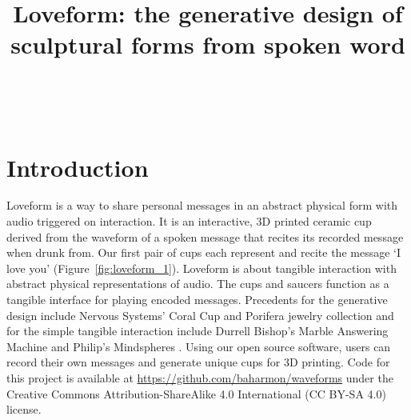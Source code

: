 \documentclass{sigchi}
\def\plaintitle{Loveform: the generative design of sculptural forms from spoken word}
\begin{document}
\title{\plaintitle}

\author{%
  \\
  \\
}

\maketitle

\begin{abstract}
\end{abstract}



\section{Introduction}

Loveform is a way to share personal messages in an abstract physical form with audio triggered on interaction. It is an interactive, 3D printed ceramic cup derived from the waveform of a spoken message that recites its recorded message when drunk from.  Our first pair of cups each represent and recite the message `I love you' (Figure~\ref{fig:loveform_1}). Loveform is about tangible interaction with abstract physical representations of audio. The cups and saucers function as a tangible interface for playing encoded messages. Precedents for the generative design include Nervous Systems’ Coral Cup and Porifera jewelry collection \cite{NervousSystem2018,NervousSystem2018a} and for the simple tangible interaction include Durrell Bishop's Marble Answering Machine \cite{Dragicevic2014} and Philip's Mindspheres \cite{Djajadiningrat2008}. Using our open source software, users can record their own messages and generate unique cups for 3D printing. Code for this project is available at \url{https://github.com/baharmon/waveforms} under the  Creative Commons Attribution-ShareAlike 4.0 International (CC BY-SA 4.0) license.
\end{document}
